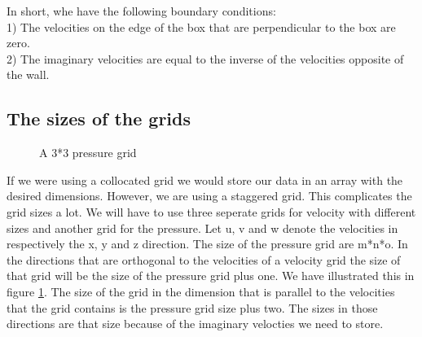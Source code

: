 \documentclass{article}
\begin{document}
In short, whe have the following boundary conditions: \\
1) The velocities on the edge of the box that are perpendicular to the box are zero.\\
2) The imaginary velocities are equal to the inverse of the velocities opposite of the wall.

\newpage
\subsection{The sizes of the grids}
\begin{figure}[ht]
\centering
\caption{A 3*3 pressure grid}
\label{grid sizes}
\end{figure}

If we were using a collocated grid we would store our data in an array with the desired dimensions. However, we are using a staggered grid. This complicates the grid sizes a lot. We will have to use three seperate grids for velocity with different sizes and another grid for the pressure. Let u, v and w denote the velocities in respectively the x, y and z direction. The size of the pressure grid are m*n*o. In the directions that are orthogonal to the velocities of a velocity grid the size of that grid will be the size of the pressure grid plus one. We have illustrated this in figure \ref{grid sizes}. The size of the grid in the dimension that is parallel to the velocities that the grid contains is the pressure grid size plus two. The sizes in those directions are that size because of the imaginary velocties we need to store.

\newpage
\end{document}
